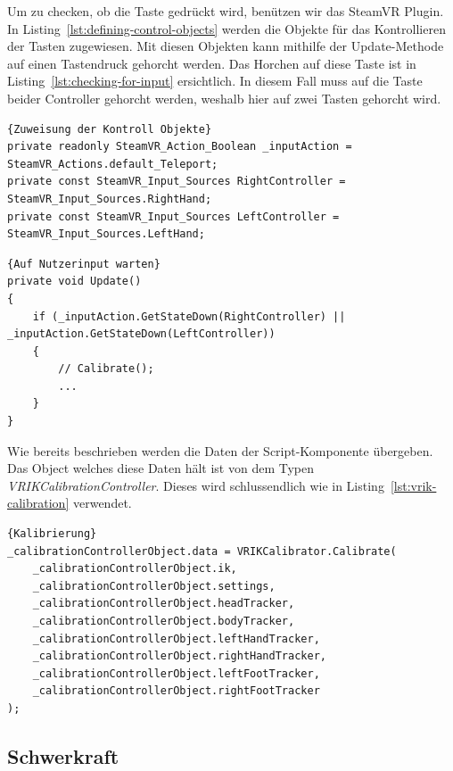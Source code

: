 Um zu checken, ob die Taste gedrückt wird, benützen wir das SteamVR Plugin.
In Listing~\ref{lst:defining-control-objects} werden die Objekte für das Kontrollieren der Tasten zugewiesen.
Mit diesen Objekten kann mithilfe der Update-Methode auf einen Tastendruck gehorcht werden.
Das Horchen auf diese Taste ist in Listing~\ref{lst:checking-for-input} ersichtlich.
In diesem Fall muss auf die Taste beider Controller gehorcht werden, weshalb hier auf zwei Tasten gehorcht wird.

\begin{lstlisting}[language={[Sharp]C},label={lst:defining-control-objects}, caption={Zuweisung der Kontroll Objekt}]{Zuweisung der Kontroll Objekte}
private readonly SteamVR_Action_Boolean _inputAction = SteamVR_Actions.default_Teleport;
private const SteamVR_Input_Sources RightController = SteamVR_Input_Sources.RightHand;
private const SteamVR_Input_Sources LeftController = SteamVR_Input_Sources.LeftHand;
\end{lstlisting}

\begin{lstlisting}[language={[Sharp]C},label={lst:checking-for-input}, caption={Auf Nutzerinput warten}]{Auf Nutzerinput warten}
private void Update()
{
    if (_inputAction.GetStateDown(RightController) || _inputAction.GetStateDown(LeftController))
    {
        // Calibrate();
        ...
    }
}
\end{lstlisting}

Wie bereits beschrieben werden die Daten der Script-Komponente übergeben.
Das Object welches diese Daten hält ist von dem Typen \emph{VRIKCalibrationController}.
Dieses wird schlussendlich wie in Listing~\ref{lst:vrik-calibration} verwendet.

\begin{lstlisting}[language={[Sharp]C},label={lst:vrik-calibration}, caption={Kalibrierung}]{Kalibrierung}
_calibrationControllerObject.data = VRIKCalibrator.Calibrate(
    _calibrationControllerObject.ik,
    _calibrationControllerObject.settings,
    _calibrationControllerObject.headTracker,
    _calibrationControllerObject.bodyTracker,
    _calibrationControllerObject.leftHandTracker,
    _calibrationControllerObject.rightHandTracker,
    _calibrationControllerObject.leftFootTracker,
    _calibrationControllerObject.rightFootTracker
);
\end{lstlisting}

\subsection{Schwerkraft}
\label{subsec:gravity}

